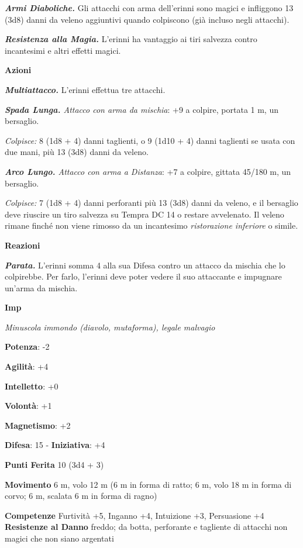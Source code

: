 \begin{multicols}{2}
\emph{\textbf{Armi Diaboliche.}} Gli attacchi con arma dell'erinni sono
magici e infliggono 13 (3d8) danni da veleno aggiuntivi quando
colpiscono (già incluso negli attacchi).

\emph{\textbf{Resistenza alla Magia.}} L'erinni ha vantaggio ai tiri
salvezza contro incantesimi e altri effetti magici.

\smallskip\textbf{Azioni}

\emph{\textbf{Multiattacco.}} L'erinni effettua tre attacchi.

\emph{\textbf{Spada Lunga.} Attacco con arma da mischia}: +9 a colpire,
portata 1 m, un bersaglio.

\emph{Colpisce:} 8 (1d8 + 4) danni taglienti, o 9 (1d10 + 4) danni
taglienti se usata con due mani, più 13 (3d8) danni da veleno.

\emph{\textbf{Arco Lungo.} Attacco con arma a Distanza}: +7 a colpire,
gittata 45/180 m, un bersaglio.

\emph{Colpisce:} 7 (1d8 + 4) danni perforanti più 13 (3d8) danni da
veleno, e il bersaglio deve riuscire un tiro salvezza su Tempra DC
14 o restare avvelenato. Il veleno rimane finché non viene rimosso da un
incantesimo \emph{ristorazione inferiore} o simile.

\textbf{Reazioni}

\emph{\textbf{Parata.}} L'erinni somma 4 alla sua Difesa contro un attacco
da mischia che lo colpirebbe. Per farlo, l'erinni deve poter vedere il
suo attaccante e impugnare un'arma da mischia.



\textbf{Imp}

\emph{Minuscola immondo (diavolo, mutaforma), legale malvagio}

\textbf{Potenza}: -2

\textbf{Agilità}: +4

\textbf{Intelletto}: +0

\textbf{Volontà}: +1

\textbf{Magnetismo}: +2

\textbf{Difesa}: 15 - \textbf{Iniziativa}: +4

\textbf{Punti Ferita} 10 (3d4 + 3)

\textbf{Movimento} 6 m, volo 12 m (6 m in forma di ratto; 6 m, volo 18 m
in forma di corvo; 6 m, scalata 6 m in forma di ragno)

\textbf{Competenze} Furtività +5, Inganno +4, Intuizione +3, Persuasione +4
\textbf{Resistenze al Danno} freddo; da botta, perforante e tagliente
di attacchi non magici che non siano argentati


\end{multicols}
